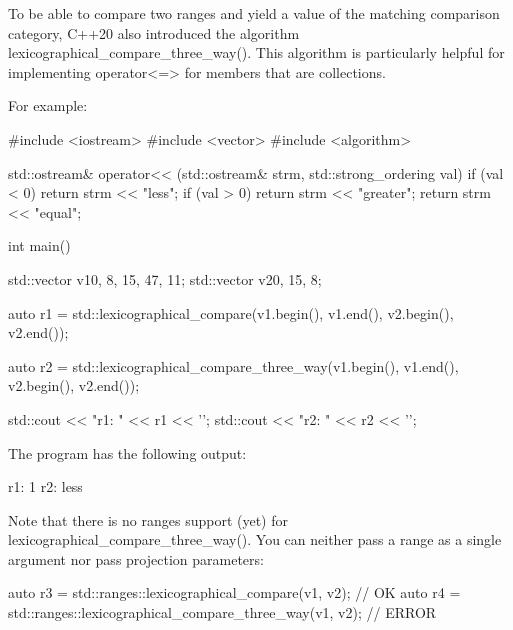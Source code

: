 To be able to compare two ranges and yield a value of the matching comparison category, C++20 also introduced the algorithm lexicographical\_compare\_three\_way(). This algorithm is particularly helpful for implementing operator<=> for members that are collections.

For example:


\begin{cpp}
#include <iostream>
#include <vector>
#include <algorithm>

std::ostream& operator<< (std::ostream& strm, std::strong_ordering val)
{
	if (val < 0) return strm << "less";
	if (val > 0) return strm << "greater";
	return strm << "equal";
}

int main()
{
	std::vector v1{0, 8, 15, 47, 11};
	std::vector v2{0, 15, 8};
	
	auto r1 = std::lexicographical_compare(v1.begin(), v1.end(),
										   v2.begin(), v2.end());
										   
	auto r2 = std::lexicographical_compare_three_way(v1.begin(), v1.end(),
													 v2.begin(), v2.end());
													 
	std::cout << "r1: " << r1 << '\n';
	std::cout << "r2: " << r2 << '\n';
}
\end{cpp}

The program has the following output:

\begin{shell}
r1: 1
r2: less
\end{shell}

Note that there is no ranges support (yet) for lexicographical\_compare\_three\_way(). You can neither pass a range as a single argument nor pass projection parameters:

\begin{cpp}
auto r3 = std::ranges::lexicographical_compare(v1, v2); // OK
auto r4 = std::ranges::lexicographical_compare_three_way(v1, v2); // ERROR
\end{cpp}




